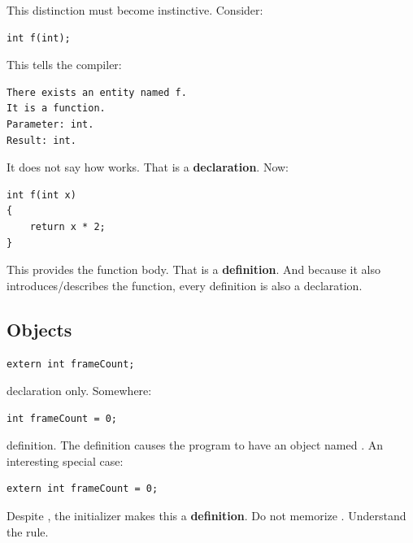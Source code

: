 \hypertarget{01-foundations-i-ch002-promises-become-definitions}{}

This distinction must become instinctive. Consider:

\begin{verbatim}
int f(int);
\end{verbatim}

This tells the compiler:

\begin{verbatim}
There exists an entity named f.
It is a function.
Parameter: int.
Result: int.
\end{verbatim}

It does not say how  works. That is a \textbf{declaration}. Now:

\begin{verbatim}
int f(int x)
{
    return x * 2;
}
\end{verbatim}

This provides the function body. That is a \textbf{definition}. And because it also introduces/describes the function, every definition is also a declaration.

\subsection{Objects}\label{01-foundations-i-ch002-objects}

\hypertarget{01-foundations-i-ch002-objects}{}

\begin{verbatim}
extern int frameCount;
\end{verbatim}

declaration only. Somewhere:

\begin{verbatim}
int frameCount = 0;
\end{verbatim}

definition. The definition causes the program to have an object named . An interesting special case:

\begin{verbatim}
extern int frameCount = 0;
\end{verbatim}

Despite , the initializer makes this a \textbf{definition}. Do not memorize . Understand the rule.

